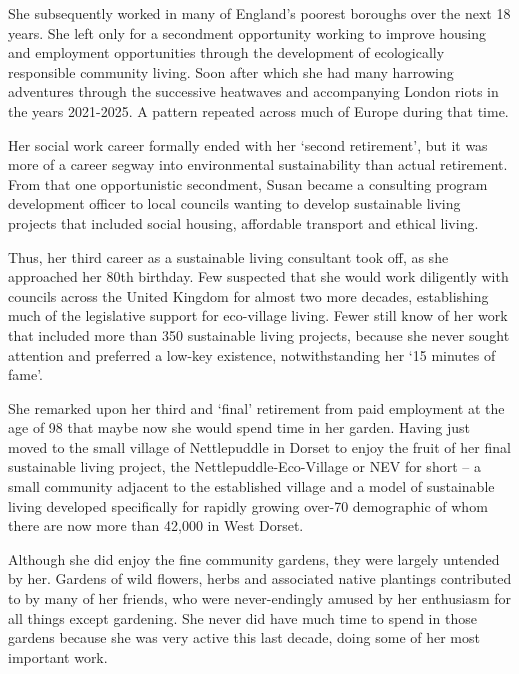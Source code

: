 She subsequently worked in many of England's poorest boroughs over the next 18 years. She left only for a secondment opportunity working to improve housing and employment opportunities through the development of ecologically responsible community living. Soon after which she had many harrowing adventures through the successive heatwaves and accompanying London riots in the years 2021-2025. A pattern repeated across much of Europe during that time.

Her social work career formally ended with her `second retirement', but it was more of a career segway into environmental sustainability than actual retirement. From that one opportunistic secondment, Susan became a consulting program development officer to local councils wanting to develop sustainable living projects that included social housing, affordable transport and ethical living.

Thus, her third career as a sustainable living consultant took off, as she approached her 80th birthday. Few suspected that she would work diligently with councils across the United Kingdom for almost two more decades, establishing much of the legislative support for eco-village living. Fewer still know of her work that included more than 350 sustainable living projects, because she never sought attention and preferred a low-key existence, notwithstanding her `15 minutes of fame'.

She remarked upon her third and `final' retirement from paid employment at the age of 98 that maybe now she would spend time in her garden. Having just moved to the small village of Nettlepuddle in Dorset to enjoy the fruit of her final sustainable living project, the Nettlepuddle-Eco-Village or NEV for short -- a small community adjacent to the established village and a model of sustainable living developed specifically for rapidly growing over-70 demographic of whom there are now more than 42,000 in West Dorset.

Although she did enjoy the fine community gardens, they were largely untended by her. Gardens of wild flowers, herbs and associated native plantings contributed to by many of her friends, who were never-endingly amused by her enthusiasm for all things except gardening. She never did have much time to spend in those gardens because she was very active this last decade, doing some of her most important work.

